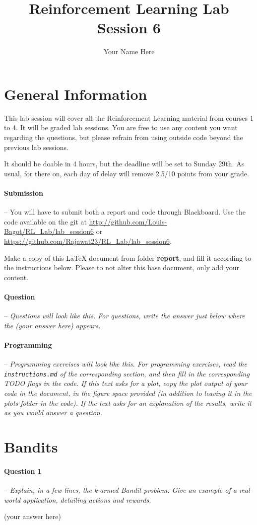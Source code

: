 \documentclass[a4paper]{article}
\title{Reinforcement Learning Lab Session 6}
\author{Your Name Here}
\newcommand{\question}[2]{
\paragraph{Question #1} -- \textit{#2}

}
\newcommand{\programming}[1]{
\paragraph{Programming} -- \textit{#1}

}
\begin{document}
\maketitle
\section*{General Information}
This lab session will cover all the Reinforcement Learning material from courses 1 to 4. It will be graded lab sessions. You are free to use any content you want regarding the questions, but please refrain from using outside code beyond the previous lab sessions.

It should be doable in 4 hours, but the deadline will be set to Sunday 29th. As usual, for there on, each day of delay will remove 2.5/10 points from your grade.

\paragraph{Submission} --
You will have to submit both a report and code through Blackboard. Use the code available on the git at \url{http://github.com/Louis-Bagot/RL_Lab/lab_session6} or \url{https://github.com/Rajawat23/RL_Lab/lab_session6}.

Make a copy of this LaTeX document from folder \textbf{report}, and fill it according to the instructions below. Please to not alter this base document, only add your content.

\question{}{Questions will look like this. For questions, write the answer just below where the (your answer here) appears.}
\programming{Programming exercises will look like this. For programming exercises, read the \texttt{instructions.md} of the corresponding section, and then fill in the corresponding TODO flags in the code. If this text asks for a plot, copy the plot output of your code in the document, in the figure space provided (in addition to leaving it in the plots folder in the code). If the text asks for an explanation of the results, write it as you would answer a question.}

\tableofcontents
\newpage

\section{Bandits}
\question{1}{Explain, in a few lines, the k-armed Bandit problem. Give an example of a real-world application, detailing actions and rewards.}
(your answer here)
\end{document}
